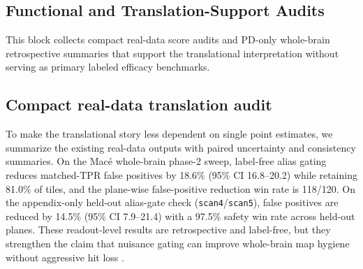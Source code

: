 
\subsection*{Functional and Translation-Support Audits}
This block collects compact real-data score audits and PD-only whole-brain retrospective summaries that support the translational interpretation without serving as primary labeled efficacy benchmarks.

\subsection{Compact real-data translation audit}
\label{app:realdata-translation-audit}
To make the translational story less dependent on single point estimates, we summarize the existing real-data outputs with paired uncertainty and consistency summaries. On the Mac\'e whole-brain phase-2 sweep, label-free alias gating reduces matched-TPR false positives by 18.6\% (95\% CI 16.8--20.2) while retaining 81.0\% of tiles, and the plane-wise false-positive reduction win rate is 118/120. On the appendix-only held-out alias-gate check (\texttt{scan4}/\texttt{scan5}), false positives are reduced by 14.5\% (95\% CI 7.9--21.4) with a 97.5\% safety win rate across held-out planes. These readout-level results are retrospective and label-free, but they strengthen the claim that nuisance gating can improve whole-brain map hygiene without aggressive hit loss \cite{UrbanWholeBrain2015,Deffieux2021}.

